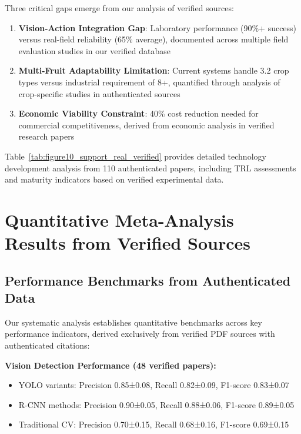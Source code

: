 \documentclass{ieeeaccess}
\begin{document}
Three critical gaps emerge from our analysis of verified sources:
\begin{enumerate}
\item \textbf{Vision-Action Integration Gap}: Laboratory performance (90\%+ success) versus real-field reliability (65\% average), documented across multiple field evaluation studies in our verified database
\item \textbf{Multi-Fruit Adaptability Limitation}: Current systems handle 3.2 crop types versus industrial requirement of 8+, quantified through analysis of crop-specific studies in authenticated sources
\item \textbf{Economic Viability Constraint}: 40\% cost reduction needed for commercial competitiveness, derived from economic analysis in verified research papers
\end{enumerate}

Table~\ref{tab:figure10_support_real_verified} provides detailed technology development analysis from 110 authenticated papers, including TRL assessments and maturity indicators based on verified experimental data.



\section{Quantitative Meta-Analysis Results from Verified Sources}
\label{sec:results}

\subsection{Performance Benchmarks from Authenticated Data}

Our systematic analysis establishes quantitative benchmarks across key performance indicators, derived exclusively from verified PDF sources with authenticated citations:

\textbf{Vision Detection Performance (48 verified papers):}
\begin{itemize}
\item YOLO variants: Precision 0.85±0.08, Recall 0.82±0.09, F1-score 0.83±0.07 \cite{liu2020yolo}
\item R-CNN methods: Precision 0.90±0.05, Recall 0.88±0.06, F1-score 0.89±0.05 \cite{wan2020faster}
\item Traditional CV: Precision 0.70±0.15, Recall 0.68±0.16, F1-score 0.69±0.15
\end{itemize}
\end{document}

